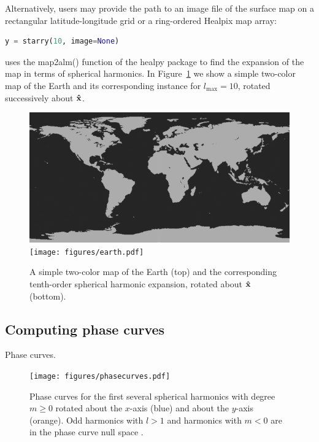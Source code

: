 \documentclass[modern]{aastex61}
\begin{document}
Alternatively, users may provide the path to an image file of the
surface map on a rectangular latitude-longitude grid or a ring-ordered
\textsf{Healpix} map array:
%
\begin{lstlisting}[language=Python]
y = starry(10, image=None)
\end{lstlisting}
%
\starry uses the \textsf{map2alm()} function
of the \textsf{healpy} package to find the expansion of the map in
terms of spherical harmonics. In Figure~\ref{fig:earth} we show a
simple two-color map of the Earth and its corresponding \starry instance for
$l_\mathrm{max} = 10$, rotated successively about $\mathbf{\hat{x}}$.
%
\begin{figure}[ht!]
    \begin{centering}
    \includegraphics[width=0.8\linewidth]{../maps/earth.jpg}
    \\[1em]
    \texttt{[image: figures/earth.pdf]}
    \caption{\label{fig:earth}
             A simple two-color map of the Earth (top) and the
             corresponding tenth-order spherical harmonic expansion,
             rotated about $\mathbf{\hat{x}}$ (bottom).}
    \end{centering}
\end{figure}
%

\subsection{Computing phase curves}
\label{sec:starryphasecurves}

Phase curves.

%
\begin{figure}[p!]
    \begin{centering}
    \texttt{[image: figures/phasecurves.pdf]}
    \caption{\label{fig:phasecurves}
             Phase curves for the first several spherical harmonics with
             degree $m \ge 0$ rotated about the $x$-axis (blue) and about
             the $y$-axis (orange).
             Odd harmonics with $l > 1$ and harmonics with $m < 0$ are
             in the phase curve null space \citep{CowanFuentesHaggard2013}.}
    \end{centering}
\end{figure}
%
\end{document}
